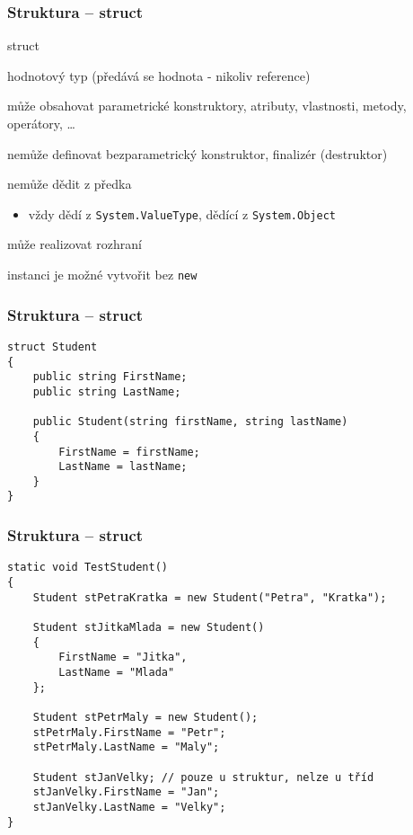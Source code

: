 


\begin{frame}[fragile]
\frametitle{Struktura -- struct}
\begin{bitemize}{struct}
\item hodnotový typ (předává se hodnota - nikoliv reference)
\item může obsahovat parametrické konstruktory, atributy, vlastnosti, metody, operátory, \ldots
\item nemůže definovat bezparametrický konstruktor, finalizér (destruktor)
\item nemůže dědit z předka
\begin{itemize}
\item vždy dědí z \lstinline|System.ValueType|, dědící z \lstinline|System.Object|
\end{itemize}
\item může realizovat rozhraní
\item instanci je možné vytvořit bez \lstinline|new|
\end{bitemize}
\end{frame}

\begin{frame}[fragile]
\frametitle{Struktura -- struct}
\begin{yesblock}
\begin{lstlisting}
struct Student
{
    public string FirstName;
    public string LastName;

    public Student(string firstName, string lastName)
    {
        FirstName = firstName;
        LastName = lastName;
    }
}
\end{lstlisting}
\end{yesblock}
\end{frame}

\begin{frame}[fragile]
\frametitle{Struktura -- struct}
\begin{yesblock}
\begin{lstlisting}[basicstyle=\small]
static void TestStudent()
{
    Student stPetraKratka = new Student("Petra", "Kratka");

    Student stJitkaMlada = new Student()
    {
        FirstName = "Jitka",
        LastName = "Mlada"
    };

    Student stPetrMaly = new Student();
    stPetrMaly.FirstName = "Petr";
    stPetrMaly.LastName = "Maly";

    Student stJanVelky; // pouze u struktur, nelze u tříd
    stJanVelky.FirstName = "Jan";
    stJanVelky.LastName = "Velky";
}
\end{lstlisting}
\end{yesblock}
\end{frame}



